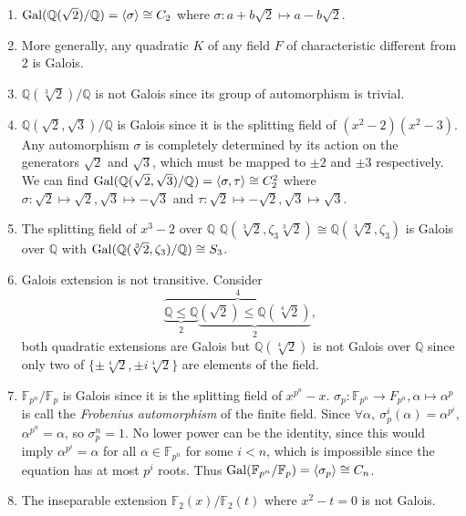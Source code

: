 \documentclass[a4paper]{article}
\begin{document}
\begin{eg}
    \begin{enumerate}
        \item $\gal(\mathbb{Q}(\sqrt 2)/\mathbb{Q}) = \langle \sigma \rangle \cong C_2$ where $\sigma: a + b \sqrt 2 \mapsto a - b \sqrt 2$.
        \item More generally, any quadratic $K$ of any field $F$ of characteristic different from $2$ is Galois.
        \item $\mathbb{Q}(\sqrt[3] 2)/\mathbb{Q}$ is not Galois since its group of automorphism is trivial.
        \item $\mathbb{Q}(\sqrt 2, \sqrt 3)/\mathbb{Q}$ is Galois since it is the splitting field of $(x^2 - 2)(x^2 - 3)$. Any automorphism $\sigma$ is completely determined by its action on the generators $\sqrt 2$ and $\sqrt 3$, which must be mapped to $\pm 2$ and $\pm 3$ respectively. We can find $\gal(\mathbb{Q}(\sqrt 2, \sqrt 3)/\mathbb{Q}) = \langle \sigma, \tau \rangle \cong C_2^2$ where $\sigma:\sqrt 2 \mapsto \sqrt 2, \sqrt 3 \mapsto -\sqrt 3$ and $\tau: \sqrt 2 \mapsto -\sqrt 2, \sqrt 3 \mapsto \sqrt 3$.
        \item The splitting field of $x^3 - 2$ over $\mathbb{Q}$ $\mathbb{Q}(\sqrt[3] 2, \zeta_3 \sqrt[3] 2) \cong \mathbb{Q}(\sqrt[3] 2, \zeta_3)$ is Galois over $\mathbb{Q}$ with $\gal(\mathbb{Q}(\sqrt[3] 2, \zeta_3)/\mathbb{Q}) \cong S_3$.
        \item Galois extension is not transitive. Consider
        \[
            \overbrace{\underbrace{\mathbb{Q} \leq \mathbb{Q}}_2\underbrace{(\sqrt 2) \leq \mathbb{Q}(\sqrt[4] 2)}_2}^4,
        \]
        both quadratic extensions are Galois but $\mathbb{Q}(\sqrt[4] 2)$ is not Galois over $\mathbb{Q}$ since only two of $\{\pm \sqrt[4] 2, \pm i \sqrt[4] 2\}$ are elements of the field.
        \item $\mathbb F_{p^n}/\mathbb F_p$ is Galois since it is the splitting field of $x^{p^n} - x$. $\sigma_p: \mathbb F_{p^n} \rightarrow F_{p^n}, \alpha \mapsto \alpha^p$ is call the \emph{Frobenius automorphism} of the finite field. Since $\forall\alpha,\: \sigma_p^i(\alpha) = \alpha^{p^i}$, $\alpha^{p^n} = \alpha$, so $\sigma_p^n = 1$. No lower power can be the identity, since this would imply $\alpha^{p^i} = \alpha$ for all $\alpha \in \mathbb F_{p^n}$ for some $i < n$, which is impossible since the equation has at most $p^i$ roots. Thus $\gal(\mathbb F_{p^n}/\mathbb F_p) = \langle \sigma_p \rangle \cong C_n$.
        \item The inseparable extension $\mathbb F_2(x)/\mathbb F_2(t)$ where $x^2 - t = 0$ is not Galois.
    \end{enumerate}
\end{eg}
\end{document}
